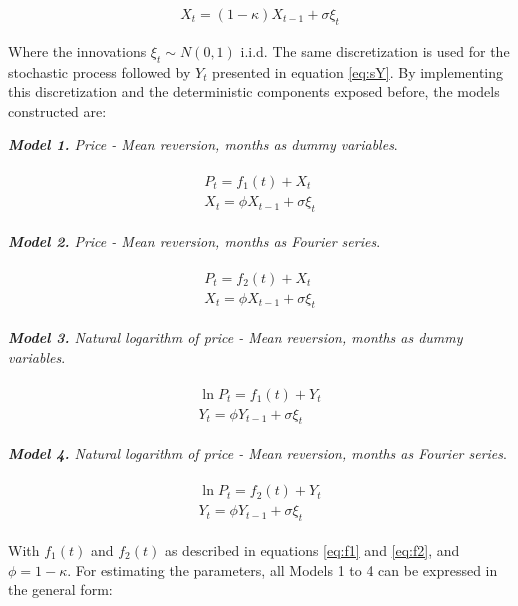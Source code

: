\documentclass[3p]{elsarticle}
\begin{document}
\begin{align}
\label{eq:disc}
X_t=(1-\kappa) X_{t-1}+\sigma \xi_t
\end{align}

Where the innovations $\xi_t\sim N(0,1)$ i.i.d. The same discretization is used for the stochastic process followed by $Y_t$ presented in equation \ref{eq:sY}. By implementing this discretization and the deterministic components exposed before, the models constructed are: 

\textit{\textbf{Model 1.} Price - Mean reversion, months as dummy variables}.

\begin{align}
\label{eq:m1}
\begin{split}
P_t=f_1(t)+X_t\\
X_t=\phi X_{t-1}+\sigma \xi_t
\end{split}
\end{align}

\textit{\textbf{Model 2.} Price - Mean reversion, months as Fourier series}.

\begin{align}
\label{eq:m2}
\begin{split}
P_t=f_2(t)+X_t\\
X_t=\phi X_{t-1}+\sigma \xi_t
\end{split}
\end{align}

\textit{\textbf{Model 3.} Natural logarithm of price - Mean reversion, months as dummy variables}.

\begin{align}
\label{eq:m3}
\begin{split}
\ln P_t=f_1(t)+Y_t\\
Y_t=\phi Y_{t-1}+\sigma \xi_t
\end{split}
\end{align}

\textit{\textbf{Model 4.} Natural logarithm of price - Mean reversion, months as Fourier series}.

\begin{align}
\label{eq:m4}
\begin{split}
\ln P_t=f_2(t)+Y_t\\
Y_t=\phi Y_{t-1}+\sigma \xi_t
\end{split}
\end{align}

With $f_1(t)$ and $f_2(t)$ as described in equations \ref{eq:f1} and \ref{eq:f2}, and $\phi=1-\kappa$. For estimating the parameters, all Models 1 to 4 can be expressed in the general form:
\end{document}

